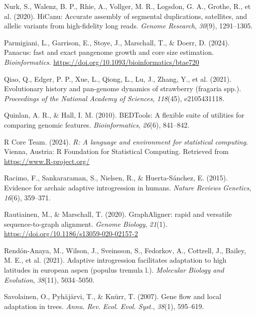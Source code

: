 \documentclass[
]{agujournal2019}
\newlength{\cslhangindent}
\newenvironment{CSLReferences}[2] %
 {\begin{list}{}{%
  \setlength{\itemindent}{0pt}
  \setlength{\leftmargin}{0pt}
  \setlength{\parsep}{0pt}
  \ifodd #1
   \setlength{\leftmargin}{\cslhangindent}
   \setlength{\itemindent}{-1\cslhangindent}
  \fi
  \setlength{\itemsep}{#2\baselineskip}}}
 {\end{list}}
\begin{document}
\begin{CSLReferences}{1}{0}
Nurk, S., Walenz, B. P., Rhie, A., Vollger, M. R., Logsdon, G. A.,
Grothe, R., et al. (2020). HiCanu: Accurate assembly of segmental
duplications, satellites, and allelic variants from high-fidelity long
reads. \emph{Genome Research}, \emph{30}(9), 1291--1305.

Parmigiani, L., Garrison, E., Stoye, J., Marschall, T., \& Doerr, D.
(2024). Panacus: fast and exact pangenome growth and core size
estimation. \emph{Bioinformatics}.
\url{https://doi.org/10.1093/bioinformatics/btae720}

Qiao, Q., Edger, P. P., Xue, L., Qiong, L., Lu, J., Zhang, Y., et al.
(2021). Evolutionary history and pan-genome dynamics of strawberry
(fragaria spp.). \emph{Proceedings of the National Academy of Sciences},
\emph{118}(45), e2105431118.

Quinlan, A. R., \& Hall, I. M. (2010). BEDTools: A flexible suite of
utilities for comparing genomic features. \emph{Bioinformatics},
\emph{26}(6), 841--842.

R Core Team. (2024). \emph{R: A language and environment for statistical
computing}. Vienna, Austria: R Foundation for Statistical Computing.
Retrieved from \url{https://www.R-project.org/}

Racimo, F., Sankararaman, S., Nielsen, R., \& Huerta-Sánchez, E. (2015).
Evidence for archaic adaptive introgression in humans. \emph{Nature
Reviews Genetics}, \emph{16}(6), 359--371.

Rautiainen, M., \& Marschall, T. (2020). GraphAligner: rapid and
versatile sequence-to-graph alignment. \emph{Genome Biology},
\emph{21}(1). \url{https://doi.org/10.1186/s13059-020-02157-2}

Rendón-Anaya, M., Wilson, J., Sveinsson, S., Fedorkov, A., Cottrell, J.,
Bailey, M. E., et al. (2021). Adaptive introgression facilitates
adaptation to high latitudes in european aspen (populus tremula l.).
\emph{Molecular Biology and Evolution}, \emph{38}(11), 5034--5050.

Savolainen, O., Pyhäjärvi, T., \& Knürr, T. (2007). Gene flow and local
adaptation in trees. \emph{Annu. Rev. Ecol. Evol. Syst.}, \emph{38}(1),
595--619.


\end{CSLReferences}
\end{document}
